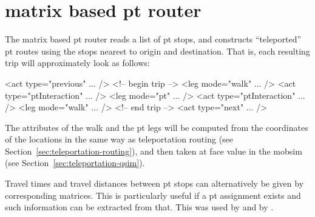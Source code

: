 %


\section{matrix based pt router}
\label{sec:matrix-based-pt-router}



The matrix based \gls{pt} router reads a list of \gls{pt} stops, and constructs ``teleported'' \gls{pt} routes using the stops nearest to origin and destination.  That is, each resulting trip will approximately look as follows:
\begin{xml}
<act type="previous" ... />
<!-- begin trip -->
<leg mode="walk" ... />
<act type="ptInteraction" ... />
<leg mode="pt" ... />
<act type="ptInteraction" ... />
<leg mode="walk" ... />
<!-- end trip -->
<act type="next" ... />  
\end{xml}

The attributes of the walk and the \gls{pt} legs will be computed from the coordinates of the locations in the same way as teleportation routing (see Section~\ref{sec:teleportation-routing}), and then taken at face value in the \gls{mobsim} (see Section~\ref{sec:teleportation-qsim}).

Travel times and travel distances between \gls{pt} stops can alternatively be given by corresponding matrices.  This is particularly useful if a \gls{pt} assignment exists and such information can be extracted from that.  This was used by \citet{RoederNagel2013SketchPlanningBrussels} and by \citet{ZoelligRenner_PhDThesis_2014}.

